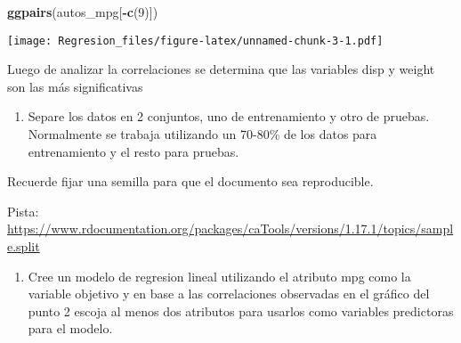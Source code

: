 \documentclass[]{article}
\newenvironment{Shaded}{\begin{snugshade}}{\end{snugshade}}
\newcommand{\DataTypeTok}[1]{\textcolor[rgb]{0.13,0.29,0.53}{#1}}
\newcommand{\DecValTok}[1]{\textcolor[rgb]{0.00,0.00,0.81}{#1}}
\newcommand{\FloatTok}[1]{\textcolor[rgb]{0.00,0.00,0.81}{#1}}
\newcommand{\KeywordTok}[1]{\textcolor[rgb]{0.13,0.29,0.53}{\textbf{#1}}}
\newcommand{\NormalTok}[1]{#1}
\newcommand{\OperatorTok}[1]{\textcolor[rgb]{0.81,0.36,0.00}{\textbf{#1}}}
\newcommand{\OtherTok}[1]{\textcolor[rgb]{0.56,0.35,0.01}{#1}}
\newcommand{\StringTok}[1]{\textcolor[rgb]{0.31,0.60,0.02}{#1}}
\providecommand{\tightlist}{%
  \setlength{\itemsep}{0pt}\setlength{\parskip}{0pt}}
\begin{document}
\begin{Shaded}
\begin{Highlighting}[]
\KeywordTok{ggpairs}\NormalTok{(autos_mpg[}\OperatorTok{-}\KeywordTok{c}\NormalTok{(}\DecValTok{9}\NormalTok{)])}
\end{Highlighting}
\end{Shaded}

\texttt{[image: Regresion\_files/figure-latex/unnamed-chunk-3-1.pdf]}

Luego de analizar la correlaciones se determina que las variables disp y
weight son las más significativas

\begin{enumerate}
\def\labelenumi{\arabic{enumi}.}
\setcounter{enumi}{2}
\tightlist
\item
  Separe los datos en 2 conjuntos, uno de entrenamiento y otro de
  pruebas. Normalmente se trabaja utilizando un 70-80\% de los datos
  para entrenamiento y el resto para pruebas.
\end{enumerate}

Recuerde fijar una semilla para que el documento sea reproducible.

Pista:
\url{https://www.rdocumentation.org/packages/caTools/versions/1.17.1/topics/sample.split}

\begin{Shaded}
\end{Shaded}

\begin{enumerate}
\def\labelenumi{\arabic{enumi}.}
\setcounter{enumi}{3}
\tightlist
\item
  Cree un modelo de regresion lineal utilizando el atributo mpg como la
  variable objetivo y en base a las correlaciones observadas en el
  gráfico del punto 2 escoja al menos dos atributos para usarlos como
  variables predictoras para el modelo.
\end{enumerate}
\end{document}
